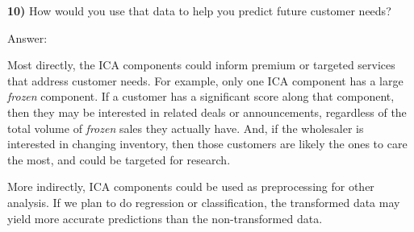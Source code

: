 \documentclass{article}
\begin{document}
    \textbf{10)} How would you use that data to help you predict future
customer needs?

    Answer:

Most directly, the ICA components could inform premium or targeted
services that address customer needs. For example, only one ICA
component has a large \emph{frozen} component. If a customer has a
significant score along that component, then they may be interested in
related deals or announcements, regardless of the total volume of
\emph{frozen} sales they actually have. And, if the wholesaler is
interested in changing inventory, then those customers are likely the
ones to care the most, and could be targeted for research.

More indirectly, ICA components could be used as preprocessing for other
analysis. If we plan to do regression or classification, the transformed
data may yield more accurate predictions than the non-transformed data.


    
    
    
    
\end{document}
